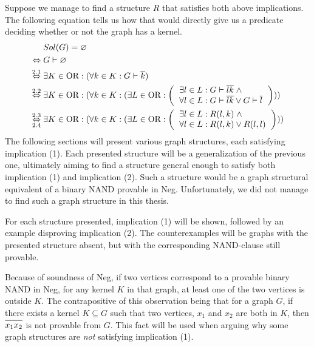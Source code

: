 Suppose we manage to find a structure $R$ that satisfies both above implications.
The following equation tells us how that would directly give us a predicate deciding whether or not the graph has a kernel.
\begin{align}
  &Sol(G) = \varnothing\\
  \Leftrightarrow\; &G \vdash \varnothing\\
  \overset{2.1}{\Leftrightarrow}\;&\exists K \in \text{OR}: (\forall  k \in K: G \vdash \ol{k})\\
  \overset{2.2}{\Leftrightarrow}\;&\exists K \in \text{OR}: (\forall  k \in K: ( \exists L \in \text{OR}:
  \left ( \begin{tabular}{l}
  $\exists l \in L: G \vdash \ol{lk} \; \wedge$\\
  $\forall l \in L: G \vdash \ol{lk} \vee G \vdash \ol{l}$
  \end{tabular} \right ) ) )\\
  \overset{2.3}{\underset{2.4}{\Leftrightarrow}}\;&\exists K \in \text{OR}: (\forall  k \in K: ( \exists L \in \text{OR}:
  \left ( \begin{tabular}{l}
  $\exists l \in L: R(l,k) \; \wedge$\\
  $\forall l \in L: R(l,k) \vee R(l,l)$
  \end{tabular} \right ) ) )
\end{align}
The following sections will present various graph structures, each satisfying implication (1).
Each presented structure will be a generalization of the previous one, ultimately aiming to find a structure general enough to satisfy both implication (1) and implication (2).
Such a structure would be a graph structural equivalent of a binary NAND provable in Neg.
Unfortunately, we did not manage to find such a graph structure in this thesis.

For each structure presented, implication (1) will be shown, followed by an example disproving implication (2).
The counterexamples will be graphs with the presented structure absent, but with the corresponding NAND-clause still provable.

Because of soundness of Neg, if two vertices correspond to a provable binary NAND in Neg, for any kernel $K$ in that graph, at least one of the two vertices is outside $K$.
The contrapositive of this observation being that for a graph $G$, if there exists a kernel $K \subseteq G$ such that two vertices, $x_1$ and $x_2$ are both in $K$, then $\ol{x_1x_2}$ is not provable from $G$.
This fact will be used when arguing why some graph structures are \textit{not} satisfying implication (1).
